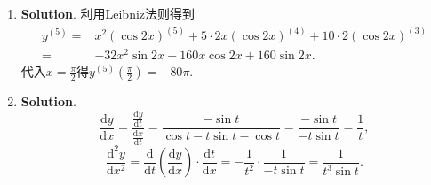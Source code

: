 \documentclass[../main.tex]{subfiles}
\begin{document}
\begin{enumerate}
    \item \textbf{Solution}. 利用Leibniz法则得到
          \[
              \begin{aligned}
                  y^{(5)}= {} & x^{2}\left(\cos 2x\right)^{(5)}+5\cdot 2x\left(\cos 2x\right)^{(4)}+10\cdot 2\left(\cos 2x\right)^{(3)} \\
                  = {}        & -32x^{2}\sin 2x+160x\cos 2x+160\sin 2x.
              \end{aligned}
          \]
          代入$x=\frac{\pi}{2}$得$y^{(5)}\left(\frac{\pi}{2}\right)=-80\pi$.

    \item \textbf{Solution}.
          \[
              \frac{\mathrm{d}y}{\mathrm{d}x}=\frac{\frac{\mathrm{d}y}{\mathrm{d}t}}{\frac{\mathrm{d}x}{\mathrm{d}t}}
              =\frac{-\sin t}{\cos t-t\sin t-\cos t}=\frac{-\sin t}{-t\sin t}=\frac{1}{t},
          \]
          \[
              \frac{\mathrm{d}^{2}y}{\mathrm{d}x^{2}}=\frac{\mathrm{d}}{\mathrm{d}t}\left
              (\frac{\mathrm{d}y}{\mathrm{d}x}\right)\cdot\frac{\mathrm{d}t}{\mathrm{d}x}
              =-\frac{1}{t^{2}}\cdot\frac{1}{-t\sin t}=\frac{1}{t^{3}\sin t}.
          \]
\end{enumerate}
\end{document}

